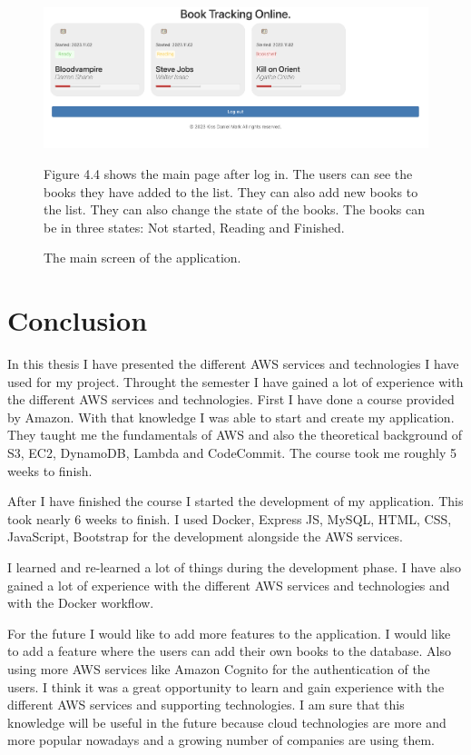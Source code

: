 \documentclass[11pt,a4paper,oneside]{report}
\begin{document}
\begin{figure}[!ht]
  \begin{center}
    \includegraphics[scale=0.3]{frontend-main.png}
    \caption{The main screen of the application.}
    \label{fig:TexnicCenter}
  \end{center}
  Figure 4.4 shows the main page after log in. The users can see the books they have added to the list. They can also add new books to the list. They can also change the state of the books. The books can be in three states: Not started, Reading and Finished.
\end{figure}

\chapter{Conclusion}

In this thesis I have presented the different AWS services and technologies I have used for my project.
Throught the semester I have gained a lot of experience with the different AWS services and technologies.
First I have done a course provided by Amazon. With that knowledge I was able to start and create my application.
They taught me the fundamentals of AWS and also the theoretical background of S3, EC2, DynamoDB, Lambda and CodeCommit.
The course took me roughly 5 weeks to finish.

After I have finished the course I started the development of my application. This took nearly 6 weeks to finish.
I used Docker, Express JS, MySQL, HTML, CSS, JavaScript, Bootstrap for the development alongside the AWS services.

I learned and re-learned a lot of things during the development phase. I have also gained a lot of experience with the different AWS services and technologies and with the Docker workflow.

For the future I would like to add more features to the application. I would like to add a feature where the users can add their own books to the database. Also using more AWS services like Amazon Cognito for the authentication of the users.
I think it was a great opportunity to learn and gain experience with the different AWS services and supporting technologies. I am sure that this knowledge will be useful in the future because cloud technologies are more and more popular nowadays and a growing number of companies are using them.
\end{document}
